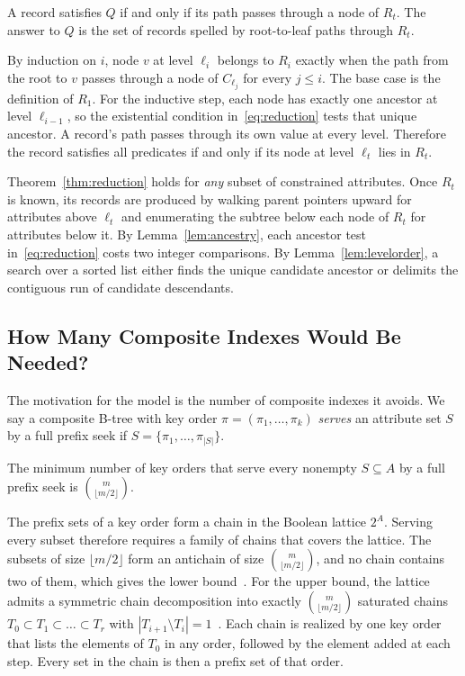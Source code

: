 \begin{theorem}
\label{thm:reduction}
A record satisfies $Q$ if and only if its path passes through a node of $R_t$. The answer to $Q$ is the set of records spelled by root-to-leaf paths through $R_t$.
\end{theorem}
\begin{IEEEproof}
By induction on $i$, node $v$ at level $\ell_i$ belongs to $R_i$ exactly when the path from the root to $v$ passes through a node of $C_{\ell_j}$ for every $j\le i$. The base case is the definition of $R_1$. For the inductive step, each node has exactly one ancestor at level $\ell_{i-1}$, so the existential condition in~\eqref{eq:reduction} tests that unique ancestor. A record's path passes through its own value at every level. Therefore the record satisfies all predicates if and only if its node at level $\ell_t$ lies in $R_t$.
\end{IEEEproof}

Theorem~\ref{thm:reduction} holds for \emph{any} subset of constrained attributes. Once $R_t$ is known, its records are produced by walking parent pointers upward for attributes above $\ell_t$ and enumerating the subtree below each node of $R_t$ for attributes below it. By Lemma~\ref{lem:ancestry}, each ancestor test in~\eqref{eq:reduction} costs two integer comparisons. By Lemma~\ref{lem:levelorder}, a search over a sorted list either finds the unique candidate ancestor or delimits the contiguous run of candidate descendants.

\subsection{How Many Composite Indexes Would Be Needed?}
\label{sec:indexcount}

The motivation for the model is the number of composite indexes it avoids. We say a composite B-tree with key order $\pi=(\pi_1,\dots,\pi_k)$ \emph{serves} an attribute set $S$ by a full prefix seek if $S=\{\pi_1,\dots,\pi_{|S|}\}$.

\begin{proposition}
\label{prop:indexcount}
The minimum number of key orders that serve every nonempty $S\subseteq A$ by a full prefix seek is $\binom{m}{\lfloor m/2\rfloor}$.
\end{proposition}
\begin{IEEEproof}
The prefix sets of a key order form a chain in the Boolean lattice $2^A$. Serving every subset therefore requires a family of chains that covers the lattice. The subsets of size $\lfloor m/2\rfloor$ form an antichain of size $\binom{m}{\lfloor m/2\rfloor}$, and no chain contains two of them, which gives the lower bound~\cite{sperner1928satz,dilworth1950decomposition}. For the upper bound, the lattice admits a symmetric chain decomposition into exactly $\binom{m}{\lfloor m/2\rfloor}$ saturated chains $T_0\subset T_1\subset\dots\subset T_r$ with $|T_{i+1}\setminus T_i|=1$~\cite{debruijn1951set}. Each chain is realized by one key order that lists the elements of $T_0$ in any order, followed by the element added at each step. Every set in the chain is then a prefix set of that order.
\end{IEEEproof}

